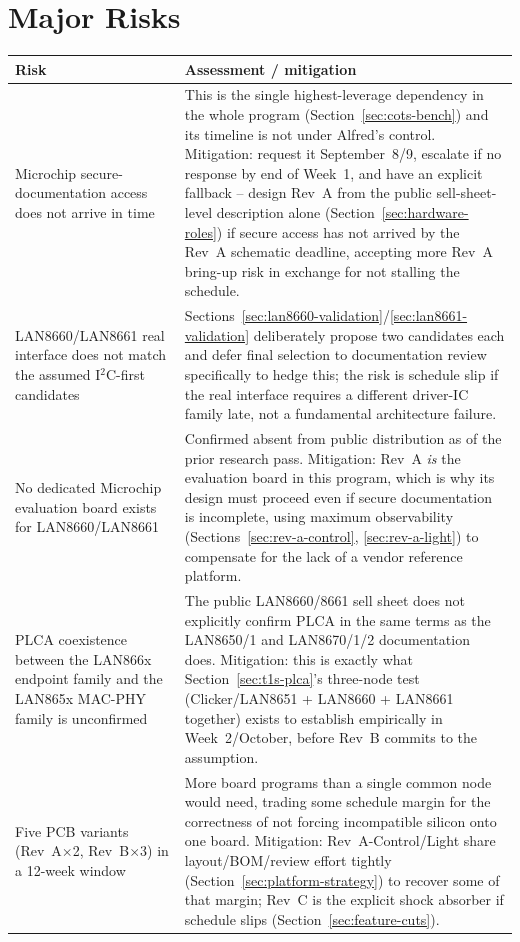 \section{Major Risks}
\label{sec:risks}

\begin{center}
\small
\begin{tabularx}{\linewidth}{@{}p{3.6cm} X@{}}
\toprule
\textbf{Risk} & \textbf{Assessment / mitigation} \\
\midrule
Microchip secure-documentation access does not arrive in time & This is the single highest-leverage dependency in the whole program (Section~\ref{sec:cots-bench}) and its timeline is not under Alfred's control. Mitigation: request it September~8/9, escalate if no response by end of Week~1, and have an explicit fallback -- design Rev~A from the public sell-sheet-level description alone (Section~\ref{sec:hardware-roles}) if secure access has not arrived by the Rev~A schematic deadline, accepting more Rev~A bring-up risk in exchange for not stalling the schedule. \\
LAN8660/LAN8661 real interface does not match the assumed I$^2$C-first candidates & Sections~\ref{sec:lan8660-validation}/\ref{sec:lan8661-validation} deliberately propose two candidates each and defer final selection to documentation review specifically to hedge this; the risk is schedule slip if the real interface requires a different driver-IC family late, not a fundamental architecture failure. \\
No dedicated Microchip evaluation board exists for LAN8660/LAN8661 & Confirmed absent from public distribution as of the prior research pass. Mitigation: Rev~A \emph{is} the evaluation board in this program, which is why its design must proceed even if secure documentation is incomplete, using maximum observability (Sections~\ref{sec:rev-a-control}, \ref{sec:rev-a-light}) to compensate for the lack of a vendor reference platform. \\
PLCA coexistence between the LAN866x endpoint family and the LAN865x MAC-PHY family is unconfirmed & The public LAN8660/8661 sell sheet does not explicitly confirm PLCA in the same terms as the LAN8650/1 and LAN8670/1/2 documentation does. Mitigation: this is exactly what Section~\ref{sec:t1s-plca}'s three-node test (Clicker/LAN8651 + LAN8660 + LAN8661 together) exists to establish empirically in Week~2/October, before Rev~B commits to the assumption. \\
Five PCB variants (Rev~A$\times$2, Rev~B$\times$3) in a 12-week window & More board programs than a single common node would need, trading some schedule margin for the correctness of not forcing incompatible silicon onto one board. Mitigation: Rev~A-Control/Light share layout/BOM/review effort tightly (Section~\ref{sec:platform-strategy}) to recover some of that margin; Rev~C is the explicit shock absorber if schedule slips (Section~\ref{sec:feature-cuts}). \\

\end{tabularx}
\end{center}
